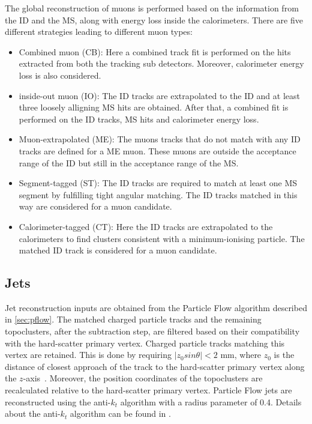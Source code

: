 The global reconstruction of muons is performed based on the information from the ID and the MS, along
with energy loss inside the calorimeters. There are five different strategies leading to different
muon types:
\begin{itemize}
    \item Combined muon (CB): Here a combined track fit is performed on the hits extracted from both
    the tracking sub detectors. Moreover, calorimeter energy loss is also considered. 
    \item inside-out muon (IO): The ID tracks are extrapolated to the ID and at least three loosely
    alligning MS hits are obtained. After that, a combined fit is performed on the ID tracks, MS hits
    and calorimeter energy loss. 
    \item Muon-extrapolated (ME): The muons tracks that do not match with any ID tracks are defined for
    a ME muon. These muons are outside the acceptance range of the ID but still in the acceptance range of the
    MS. 
    \item Segment-tagged (ST): The ID tracks are required to match at least one MS segment by fulfilling
    tight angular matching. The ID tracks matched in this way are considered for a muon candidate.
    \item Calorimeter-tagged (CT): Here the ID tracks are extrapolated to the calorimeters to find
    clusters consistent with a minimum-ionising particle. The matched ID track is considered for a 
    muon candidate. 
\end{itemize}


\subsection*{Jets}
Jet reconstruction inputs are obtained from the Particle Flow algorithm described in \cref{sec:pflow}. The
matched charged particle tracks and the remaining topoclusters, after the subtraction step, are 
filtered based on their compatibility with the hard-scatter primary vertex. Charged particle 
tracks matching this vertex are retained. This is done by requiring $|z_0 sin\theta|<2$ mm, 
where $z_0$ is the distance of closest approach of the track to the hard-scatter primary vertex 
along the $z$-axis~\cite{Aaboud:2257597}. Moreover, the position coordinates of the topoclusters are recalculated 
relative to the hard-scatter primary vertex. Particle Flow jets are reconstructed using the 
anti-$k_t$ algorithm with a radius parameter of 0.4. Details about the anti-$k_t$ algorithm 
can be found in \cite{Cacciari:2008gp}.

